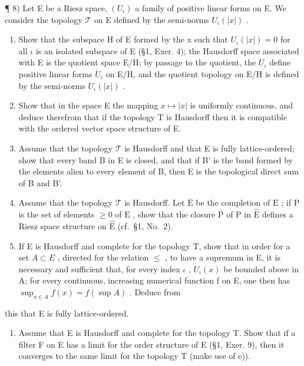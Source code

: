¶ 8) Let E be a Riesz space, \((U_{\iota})\) a family of positive linear forms on E. We consider the topology \(\mathcal{T}\) on E defined by the semi-norms \(U_{\iota}(|x|)\) .

\begin{enumerate}
\def\labelenumi{\alph{enumi})}
\item
  Show that the subspace H of E formed by the x such that \(U_{\iota}(|x|)=0\) for all \(\iota\) is an isolated subspace of E (§1, Exer. 4); the Hausdorff space associated with E is the quotient space E/H; by passage to the quotient, the \(U_{\iota}\) define positive linear forms \(\dot{U}_{\iota}\) on E/H, and the quotient topology on E/H is defined by the semi-norms \(\dot{U}_{\iota}(|\dot{x}|)\) .
\item
  Show that in the space E the mapping \(x \mapsto |x|\) is uniformly continuous, and deduce therefrom that if the topology T is Hausdorff then it is compatible with the ordered vector space structure of E.
\item
  Assume that the topology \(\mathcal{T}\) is Hausdorff and that E is fully lattice-ordered; show that every band B in E is closed, and that if B' is the band formed by the elements alien to every element of B, then E is the topological direct sum of B and B'.
\item
  Assume that the topology \(\mathcal{T}\) is Hausdorff. Let \(\overline{\mathrm{E}}\) be the completion of \(\mathrm{E}\) ; if \(\mathrm{P}\) is the set of elements \(\geqslant 0\) of \(\mathrm{E}\) , show that the closure \(\overline{\mathrm{P}}\) of \(\mathrm{P}\) in \(\widehat{\mathrm{E}}\) defines a Riesz space structure on \(\widehat{\mathrm{E}}\) (cf.~§1, No.~2).
\item
  If E is Hausdorff and complete for the topology T, show that in order for a set \(A \subset E\) , directed for the relation \(\leqslant\) , to have a supremum in E, it is necessary and sufficient that, for every index \(\iota\) , \(U_{\iota}(x)\) be bounded above in A; for every continuous, increasing numerical function f on E, one then has \(\sup_{x \in A} f(x) = f(\sup A)\) . Deduce from
\end{enumerate}

this that E is fully lattice-ordered.

\begin{enumerate}
\def\labelenumi{\alph{enumi})}
\setcounter{enumi}{5}
\tightlist
\item
  Assume that E is Hausdorff and complete for the topology T. Show that if a filter F on E has a limit for the order structure of E (§1, Exer. 9), then it converges to the same limit for the topology T (make use of e)).
\end{enumerate}

